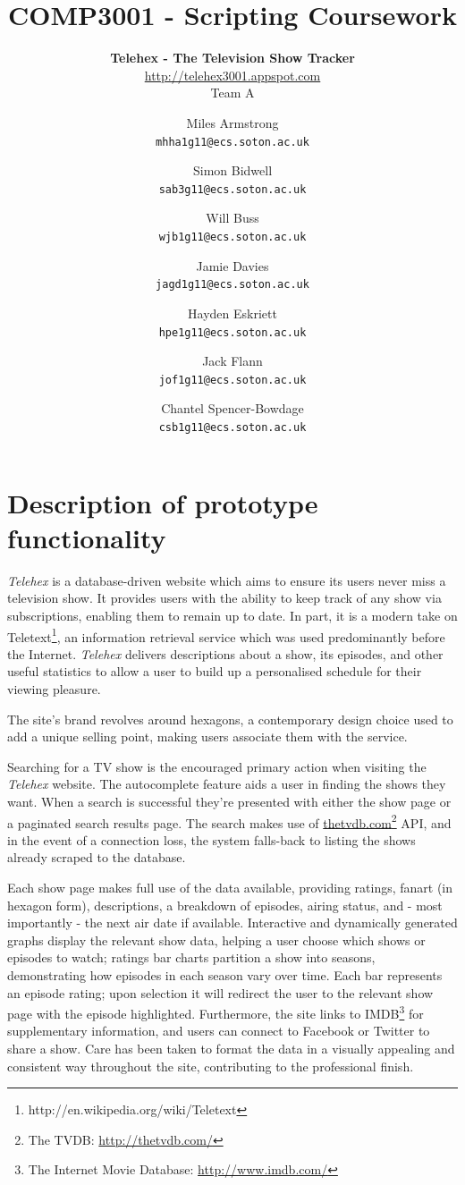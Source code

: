 \documentclass[12pt, a4paper]{article}
\title{\Huge COMP3001 - Scripting Coursework}
\subtitle{\textbf{Telehex - The Television Show Tracker}\\[0.1cm]\href{http://telehex3001.appspot.com}{http://telehex3001.appspot.com}\\[2em] \Large Team A}
\author{
  Miles Armstrong\\
  \texttt{mhha1g11@ecs.soton.ac.uk}
  \and 
  Simon Bidwell\\
  \texttt{sab3g11@ecs.soton.ac.uk}
  \and 
  Will Buss\\
  \texttt{wjb1g11@ecs.soton.ac.uk}
  \and  
  Jamie Davies\\
  \texttt{jagd1g11@ecs.soton.ac.uk}
  \and  
  Hayden Eskriett\\
  \texttt{hpe1g11@ecs.soton.ac.uk}
  \and
  Jack Flann\\
  \texttt{jof1g11@ecs.soton.ac.uk}
  \and
  Chantel Spencer-Bowdage\\
  \texttt{csb1g11@ecs.soton.ac.uk}\\[2em]
}
\begin{document}
{\color{white}
\clearpage\maketitle
\thispagestyle{empty}
}
\newpage
\section{Description of prototype functionality}

\textit{Telehex} is a database-driven website which aims to ensure its users never miss a television show. It provides users with the ability to keep track of any show via subscriptions, enabling them to remain up to date. In part, it is a modern take on Teletext\footnote{http://en.wikipedia.org/wiki/Teletext}, an information retrieval service which was used predominantly before the Internet. \textit{Telehex} delivers descriptions about a show, its episodes, and other useful statistics to allow a user to build up a personalised schedule for their viewing pleasure. 

The site's brand revolves around hexagons, a contemporary design choice used to add a unique selling point, making users associate them with the service.  

Searching for a TV show is the encouraged primary action when visiting the \textit{Telehex} website. The autocomplete feature aids a user in finding the shows they want. When a search is successful they're presented with either the show page or a paginated search results page. The search makes use of \href{http://thetvdb.com/}{thetvdb.com}\footnote{The TVDB: \href{http://thetvdb.com/}{http://thetvdb.com/}} API, and in the event of a connection loss, the system falls-back to listing the shows already scraped to the database.

Each show page makes full use of the data available, providing ratings, fanart (in hexagon form), descriptions, a breakdown of episodes, airing status, and - most importantly - the next air date if available. Interactive and dynamically generated graphs display the relevant show data, helping a user choose which shows or episodes to watch; ratings bar charts partition a show into seasons, demonstrating how episodes in each season vary over time. Each bar represents an episode rating; upon selection it will redirect the user to the relevant show page with the episode highlighted. Furthermore, the site links to IMDB\footnote{The Internet Movie Database: \href{http://www.imdb.com/}{http://www.imdb.com/}} for supplementary information, and users can connect to Facebook or Twitter to share a show. Care has been taken to format the data in a visually appealing and consistent way throughout the site, contributing to the professional finish. 
\end{document}
